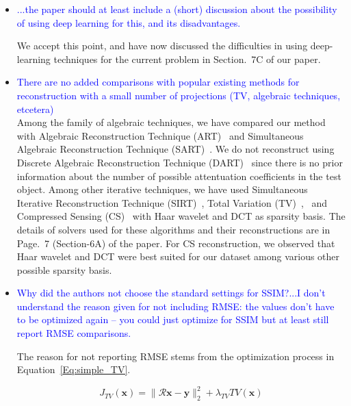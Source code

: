 \documentclass{article}
\begin{document}
 \begin{itemize}
 \item    \textcolor{blue}{...the paper should at least include a (short) discussion about the
     possibility of using deep learning for this, and its disadvantages.}

   We accept this point, and have now discussed the difficulties in
   using deep-learning techniques for the current problem in Section.~7C
   of our paper. 

\item \textcolor{blue}{There are no added comparisons with popular existing methods for
  reconstruction with a small number of projections (TV, algebraic techniques, etcetera)}\\
  
 Among the family of algebraic techniques, we have compared our method
 with Algebraic Reconstruction Technique (ART)~\cite{art} and Simultaneous
 Algebraic Reconstruction Technique (SART)~\cite{sart}. We do not reconstruct
 using Discrete Algebraic Reconstruction Technique (DART)~\cite{dart} since there
 is no prior information about the number of possible attentuation
 coefficients in the test object.
 Among other iterative techniques, we
 have used Simultaneous Iterative Reconstruction Technique (SIRT)~\cite{sirt},
 Total Variation (TV)~\cite{TV},~\cite{TVReg} and Compressed Sensing (CS)~\cite{lasso} with Haar wavelet
 and DCT as sparsity basis. The details of solvers used for these
 algorithms and their reconstructions are in Page.~7 (Section-6A) of
 the paper. For CS reconstruction, we observed that Haar wavelet and
 DCT were best suited for our dataset among various other possible
 sparsity basis.

\item \textcolor{blue}{Why did the authors not choose the standard
  settings for SSIM?...I don’t understand the reason given for not
  including RMSE: the values don’t have to be optimized again -- you
  could just optimize for SSIM but at least still report RMSE
  comparisons.}

  The reason for not reporting RMSE stems from the optimization
  process in Equation~\ref{Eq:simple_TV}.
  
 \begin{equation}
   J_{TV}(\boldsymbol{x}) = \lVert\boldsymbol{\mathcal{R}x}- \boldsymbol{y}\rVert_2^2 + \lambda_{TV}TV(\boldsymbol{x})
   \label{Eq:simple_TV}
 \end{equation}


\end{itemize}
\end{document}
